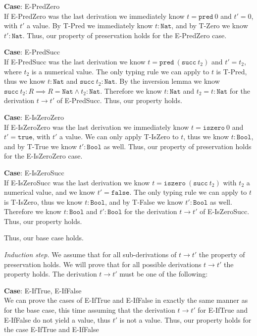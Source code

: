 \documentclass[12pt, fleqn]{article}
\begin{document}
\medskip
\textbf{Case}: E-PredZero\\
If E-PredZero was the last derivation we immediately know $t = \texttt{pred}\:0$ and $t' = 0$, with $t'$ a value.
By T-Pred we immediately know $t : \texttt{Nat}$, and by T-Zero we know $t' : \texttt{Nat}$. Thus, our property
of preservation holds for the E-PredZero case.

\medskip
\textbf{Case}: E-PredSucc\\
If E-PredSucc was the last derivation we know  $t = \texttt{pred}\:(\texttt{succ}\:t_2)$ and $t' = t_2$,
where $t_2$ is a numerical value. The only typing rule we can apply to $t$ is T-Pred, thus we know $t : \texttt{Nat}$
and $\texttt{succ}\:t_2 : \texttt{Nat}$. By the inversion lemma we know $\texttt{succ}\:t_2 : R \implies R = \texttt{Nat} \land
t_2 : \texttt{Nat}$. Therefore we know $t : \texttt{Nat}$ and $t_2 = t : \texttt{Nat}$ for the derivation $t \rightarrow t'$ of
E-PredSucc. Thus, our property holds.

\medskip
\textbf{Case}: E-IsZeroZero\\
If E-IsZeroZero was the last derivation we immediately know $t = \texttt{iszero}\:0$ and $t' = \texttt{true}$, with
$t'$ a value. We can only apply T-IsZero to $t$, thus we know $t : \texttt{Bool}$, and by T-True we know $t' : \texttt{Bool}$
as well. Thus, our property of preservation holds for the E-IsZeroZero case.

\medskip
\textbf{Case}: E-IsZeroSucc\\
If E-IsZeroSucc was the last derivation we know $t = \texttt{iszero}\:(\texttt{succ}\:t_2)$ with $t_2$ a numerical value,
and we know $t' = \texttt{false}$. The only typing rule we can apply to $t$ is T-IsZero, thus we know $t : \texttt{Bool}$, 
and by T-False we know $t' : \texttt{Bool}$ as well. Therefore we know $t : \texttt{Bool}$ and $t' : \texttt{Bool}$ for the
derivation $t \rightarrow t'$ of E-IsZeroSucc. Thus, our property holds.

\medskip
Thus, our base case holds.

\medskip
\emph{Induction step.} We assume that for all sub-derivations of $t \rightarrow t'$ the property of preservation
holds. We will prove that for all possible derivations $t \rightarrow t'$ the property holds. The derivation $t
\rightarrow t'$ must be one of the following:

\medskip
\textbf{Case}: E-IfTrue, E-IfFalse\\
We can prove the cases of E-IfTrue and E-IfFalse in exactly the same manner as for the base case, this time assuming that
the derivation $t \rightarrow t'$ for E-IfTrue and E-IfFalse do not yield a value, thus $t'$ is not a value.
Thus, our property holds for the case E-IfTrue and E-IfFalse
\end{document}
